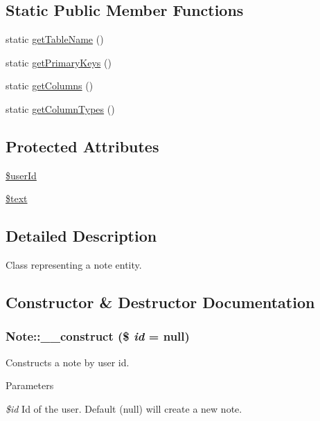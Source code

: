 \subsection*{Static Public Member Functions}
\begin{DoxyCompactItemize}
\item 
static \hyperlink{classNote_a83deedb316c670baa4b31c8d512e6af6}{getTableName} ()
\item 
static \hyperlink{classNote_a72d5489c580726d4fbb55359ae98db5a}{getPrimaryKeys} ()
\item 
static \hyperlink{classNote_ab602c2348fab90e66d061b62c2eb0aac}{getColumns} ()
\item 
static \hyperlink{classNote_afb67f78e11e21140b15735ce5a78d5ba}{getColumnTypes} ()
\end{DoxyCompactItemize}
\subsection*{Protected Attributes}
\begin{DoxyCompactItemize}
\item 
\hyperlink{classNote_a98ea63ab026014b1d8d2f1531a2a481e}{\$userId}
\item 
\hyperlink{classNote_ae670c2f241d1653966e68b2f3b8ecbaf}{\$text}
\end{DoxyCompactItemize}


\subsection{Detailed Description}
Class representing a note entity. 

\subsection{Constructor \& Destructor Documentation}
\hypertarget{classNote_ae60466bb5611822f5fa13ca5ee45af8c}{
\subsubsection[{\_\-\_\-construct}]{\setlength{\rightskip}{0pt plus 5cm}Note::\_\-\_\-construct (\$ {\em id} = {\ttfamily null})}}
\label{classNote_ae60466bb5611822f5fa13ca5ee45af8c}
Constructs a note by user id.


\begin{DoxyParams}{Parameters}
\item[{\em \$id}]Id of the user. Default (null) will create a new note. \end{DoxyParams}


